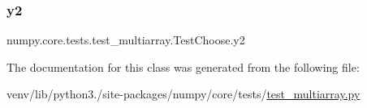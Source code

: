 \subsubsection{\texorpdfstring{y2}{y2}}
{\footnotesize\ttfamily numpy.\+core.\+tests.\+test\+\_\+multiarray.\+Test\+Choose.\+y2}



The documentation for this class was generated from the following file\+:\begin{DoxyCompactItemize}
\item 
venv/lib/python3./site-\/packages/numpy/core/tests/\hyperlink{core_2tests_2test__multiarray_8py}{test\+\_\+multiarray.\+py}\end{DoxyCompactItemize}
